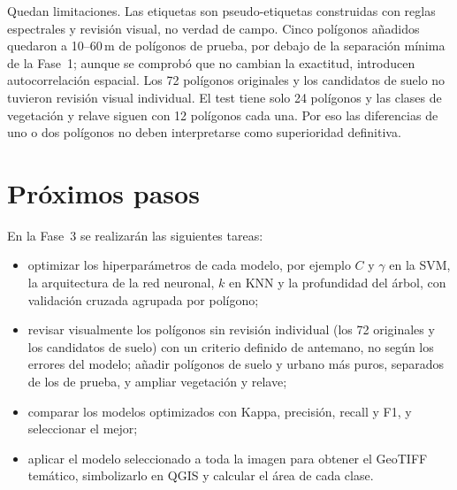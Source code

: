 \documentclass{article}
\begin{document}
Quedan limitaciones. Las etiquetas son pseudo-etiquetas construidas con reglas espectrales y revisión visual, no verdad de campo. Cinco polígonos añadidos quedaron a 10--60\,m de polígonos de prueba, por debajo de la separación mínima de la Fase~1; aunque se comprobó que no cambian la exactitud, introducen autocorrelación espacial. Los 72 polígonos originales y los candidatos de suelo no tuvieron revisión visual individual. El test tiene solo 24 polígonos y las clases de vegetación y relave siguen con 12 polígonos cada una. Por eso las diferencias de uno o dos polígonos no deben interpretarse como superioridad definitiva.

\section{Próximos pasos}
En la Fase~3 se realizarán las siguientes tareas:
\begin{itemize}
 \item optimizar los hiperparámetros de cada modelo, por ejemplo $C$ y $\gamma$ en la SVM, la arquitectura de la red neuronal, $k$ en KNN y la profundidad del árbol, con validación cruzada agrupada por polígono;
 \item revisar visualmente los polígonos sin revisión individual (los 72 originales y los candidatos de suelo) con un criterio definido de antemano, no según los errores del modelo; añadir polígonos de suelo y urbano más puros, separados de los de prueba, y ampliar vegetación y relave;
 \item comparar los modelos optimizados con Kappa, precisión, recall y F1, y seleccionar el mejor;
 \item aplicar el modelo seleccionado a toda la imagen para obtener el GeoTIFF temático, simbolizarlo en QGIS y calcular el área de cada clase.
\end{itemize}

\printbibliography
\end{document}
